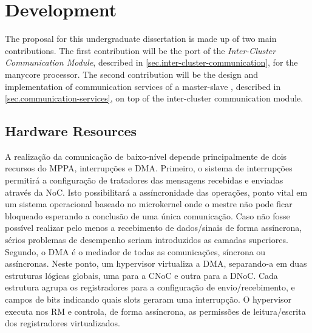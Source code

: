 \chapter{Development}
\label{ch.development}


	The proposal for this undergraduate dissertation is made up of two main contributions.
	The first contribution will be the port of the \textit{Inter-Cluster Communication Module},
	described in \autoref{sec.inter-cluster-communication}, for the \mppa manycore processor.
	The second contribution will be the design and implementation of communication services
	of a master-slave \os, described in \autoref{sec.communication-services}, on top of
	the inter-cluster communication module.


	\section{\mppa Hardware Resources}
	\label{sec.mppa-hardware-resources}

		A realização da comunicação de baixo-nível depende principalmente de dois recursos do MPPA, interrupções e DMA.
		Primeiro, o sistema de interrupções permitirá a configuração de tratadores das mensagens recebidas e enviadas através da NoC.
		Isto possibilitará a assíncronidade das operações, ponto vital em um sistema operacional baseado no microkernel onde o mestre não pode ficar bloqueado esperando a conclusão de uma única comunicação.
		Caso não fosse possível realizar pelo menos a recebimento de dados/sinais de forma assíncrona, sérios problemas de desempenho seriam introduzidos as camadas superiores.
		Segundo, o DMA é o mediador de todas as comunicações, síncrona ou assíncronas.
		Neste ponto, um hypervisor virtualiza a DMA, separando-a em duas estruturas lógicas globais, uma para a CNoC e outra para a DNoC.
		Cada estrutura agrupa os registradores para a configuração de envio/recebimento, e campos de bits indicando quais slots geraram uma interrupção.
		O hypervisor executa nos RM e controla, de forma assíncrona, as permissões de leitura/escrita dos registradores virtualizados.

